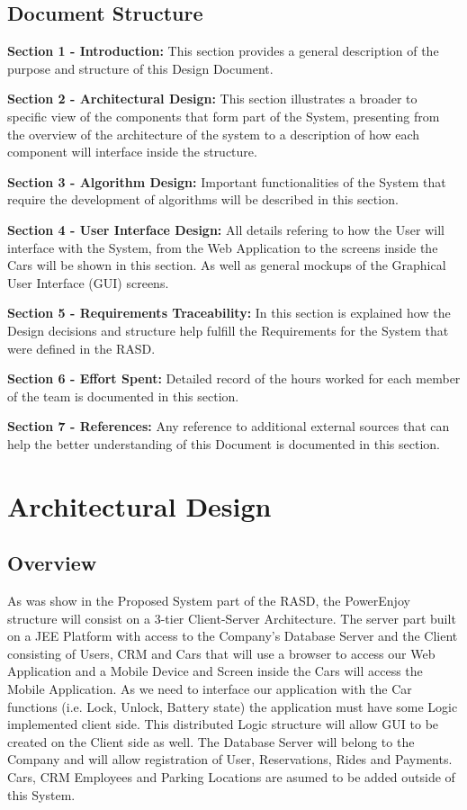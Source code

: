 \documentclass[a4paper]{article}
\begin{document}
\subsection{Document Structure}
\begin{description}
\item \textbf{Section 1 - Introduction:} This section provides a general description of the purpose and structure of this Design Document.
\item \textbf{Section 2 - Architectural Design:} This section illustrates a broader to specific view of the components that form part of the System, presenting from the overview of the architecture of the system to a description of how each component will interface inside the structure.
\item \textbf{Section 3 - Algorithm Design:} Important functionalities of the System that require the development of algorithms will be described in this section.  
\item \textbf{Section 4 - User Interface Design:} All details refering to how the User will interface with the System, from the Web Application to the screens inside the Cars will be shown in this section. As well as general mockups of the Graphical User Interface (GUI) screens.
\item \textbf{Section 5 - Requirements Traceability:} In this section is explained how the Design decisions and structure help fulfill the Requirements for the System that were defined in the RASD. 
\item \textbf{Section 6 - Effort Spent:} Detailed record of the hours worked for each member of the team is documented in this section.
\item \textbf{Section 7 - References:} Any reference to additional external sources that can help the better understanding of this Document is documented in this section.
\end{description}

\newpage
\section{Architectural Design}
\subsection{Overview}
As was show in the Proposed System part of the RASD, the PowerEnjoy structure will consist on a 3-tier Client-Server Architecture. The server part built on a JEE Platform with access to the Company's Database Server and the Client consisting of Users, CRM and Cars that will use a browser to access our Web Application and a Mobile Device and Screen inside the Cars will access the Mobile Application.
As we need to interface our application with the Car functions (i.e. Lock, Unlock, Battery state) the application must have some Logic implemented client side. This distributed Logic structure will allow GUI to be created on the Client side as well.
The Database Server will belong to the Company and will allow registration of User, Reservations, Rides and Payments. Cars, CRM Employees and Parking Locations are asumed to be added outside of this System.
\end{document}
